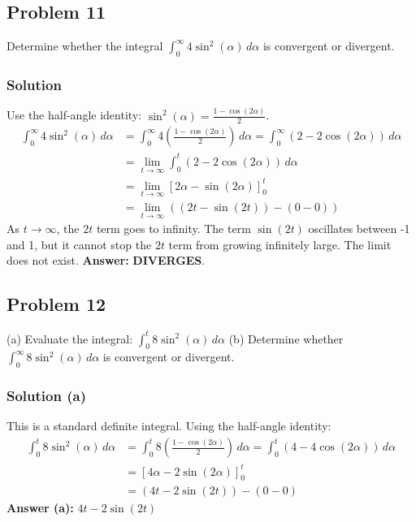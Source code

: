 \documentclass{article}
\begin{document}
\subsection{Problem 11}
Determine whether the integral $ \int_{0}^{\infty} 4\sin^2(\alpha) \,d\alpha $ is convergent or divergent.
\subsubsection*{Solution}
Use the half-angle identity: $ \sin^2(\alpha) = \frac{1-\cos(2\alpha)}{2} $.
\begin{align*}
    \int_{0}^{\infty} 4\sin^2(\alpha) \,d\alpha &= \int_{0}^{\infty} 4\left(\frac{1-\cos(2\alpha)}{2}\right) \,d\alpha = \int_{0}^{\infty} (2-2\cos(2\alpha)) \,d\alpha \\
    &= \lim_{t \to \infty} \int_{0}^{t} (2-2\cos(2\alpha)) \,d\alpha \\
    &= \lim_{t \to \infty} \left[ 2\alpha - \sin(2\alpha) \right]_{0}^{t} \\
    &= \lim_{t \to \infty} ( (2t - \sin(2t)) - (0-0) )
\end{align*}
As $ t \to \infty $, the $2t$ term goes to infinity. The term $ \sin(2t) $ oscillates between -1 and 1, but it cannot stop the $2t$ term from growing infinitely large. The limit does not exist.
\textbf{Answer:} \textbf{DIVERGES}.

\subsection{Problem 12}
(a) Evaluate the integral: $ \int_{0}^{t} 8\sin^2(\alpha) \,d\alpha $
(b) Determine whether $ \int_{0}^{\infty} 8\sin^2(\alpha) \,d\alpha $ is convergent or divergent.
\subsubsection*{Solution (a)}
This is a standard definite integral. Using the half-angle identity:
\begin{align*}
    \int_{0}^{t} 8\sin^2(\alpha) \,d\alpha &= \int_{0}^{t} 8\left(\frac{1-\cos(2\alpha)}{2}\right) \,d\alpha = \int_{0}^{t} (4-4\cos(2\alpha)) \,d\alpha \\
    &= \left[ 4\alpha - 2\sin(2\alpha) \right]_{0}^{t} \\
    &= (4t - 2\sin(2t)) - (0-0)
\end{align*}
\textbf{Answer (a):} $ 4t - 2\sin(2t) $
\end{document}
